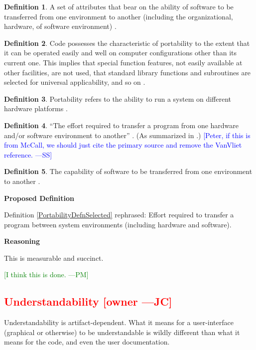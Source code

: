 \documentclass[letterpaper,cleveref]{lipics-v2019}
\newcommand{\authornote}[3]{\textcolor{#1}{[#3 ---#2]}}
\newcommand{\authornote}[3]{}
\newcommand{\wss}[1]{\authornote{blue}{SS}{#1}} %
\newcommand{\jc}[1]{\authornote{red}{JC}{#1}} %
\newcommand{\pmi}[1]{\authornote{green}{PM}{#1}} %
\newcommand{\notdone}[1]{\textcolor{red}{#1}}
\theoremstyle{definition}
\newtheorem{defn}{Definition}
\begin{document}
\begin{defn}
  A set of attributes that bear on the ability of software to be transferred
  from one environment to another (including the organizational, hardware, of
  software environment) \citep{pfleeger2006software}.
\end{defn}

\begin{defn}
  Code possesses the characteristic of portability to the extent that it can be
  operated easily and well on computer configurations other than its current
  one. This implies that special function features, not easily available at
  other facilities, are not used, that standard library functions and
  subroutines are selected for universal applicability, and so on
  \citep{boehm2007software}.
\end{defn}

\begin{defn}
  Portability refers to the ability to run a system on different hardware
  platforms \citep{ghezzi1991fundamentals}.
\end{defn}

\begin{defn}
  ``The effort required to transfer a program from one hardware and/or software
  environment to another'' \citep{McCallEtAl1977}. (As summarized in
  \citet{VanVliet2000}.)  \wss{Peter, if this is from McCall, we should just
    cite the primary source and remove the VanVliet reference.}
\end{defn}

\begin{defn}
  The capability of software to be transferred from one environment to another
  \cite{ISO9126}.
\end{defn}
\noindent \textbf{Proposed Definition}

Definition \ref{PortabilityDefnSelected} rephrased: Effort required to transfer
a program between system environments (including hardware and software).

\noindent \textbf{Reasoning}

This is measurable and succinct. 

\pmi{I think this is done.}

\subsection{\notdone{Understandability} \jc{owner}}

Understandability is artifact-dependent. What it means for a user-interface
(graphical or otherwise) to be understandable is wildly different than what it
means for the code, and even the user documentation.
\end{document}
